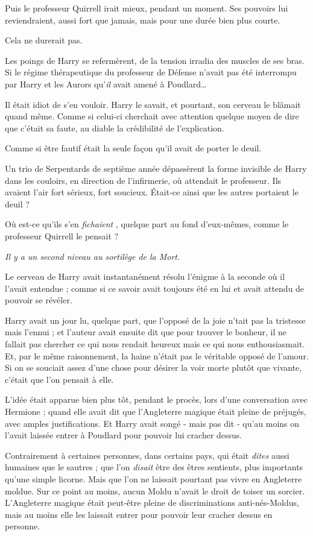 Puis le professeur Quirrell irait mieux, pendant un moment. Ses pouvoirs lui reviendraient, aussi fort que jamais, mais pour une durée bien plus courte.

Cela ne durerait pas.

Les poings de Harry se refermèrent, de la tension irradia des muscles de ses bras. Si le régime thérapeutique du professeur de Défense n'avait pas été interrompu par Harry et les Aurors qu'\emph{il}  avait amené à Poudlard…

Il était idiot de s'en vouloir. Harry le savait, et pourtant, son cerveau le blâmait quand même. Comme si celui-ci cherchait avec attention quelque moyen de dire que c'était sa faute, au diable la crédibilité de l'explication.

Comme si être fautif était la seule façon qu'il avait de porter le deuil.

Un trio de Serpentards de septième année dépassèrent la forme invisible de Harry dans les couloirs, en direction de l'infirmerie, où attendait le professeur. Ils avaient l'air fort sérieux, fort soucieux. Était-ce ainsi que les autres portaient le deuil ?

Où est-ce qu'ils s'en \emph{fichaient} , quelque part au fond d'eux-mêmes, comme le professeur Quirrell le pensait ?

\emph{Il y a un second niveau au sortilège de la Mort.} 

Le cerveau de Harry avait instantanément résolu l'énigme à la seconde où il l'avait entendue ; comme si ce savoir avait toujours été en lui et avait attendu de pouvoir se révéler.

Harry avait un jour lu, quelque part, que l'opposé de la joie n'tait pas la tristesse mais l'ennui ; et l'auteur avait ensuite dit que pour trouver le bonheur, il ne fallait pas chercher ce qui nous rendait heureux mais ce qui nous enthousiasmait. Et, par le même raisonnement, la haine n'était pas le véritable opposé de l'amour. Si on se souciait assez d'une chose pour désirer la voir morte plutôt que vivante, c'était que l'on pensait à elle.

L'idée était apparue bien plus tôt, pendant le procès, lors d'une conversation avec Hermione ; quand elle avait dit que l'Angleterre magique était pleine de préjugés, avec amples justifications. Et Harry avait songé - mais pas dit - qu'au moins on l'avait laissée entrer à Poudlard pour pouvoir lui cracher dessus.

Contrairement à certaines personnes, dans certains pays, qui était \emph{dites}  aussi humaines que le sautres ; que l'on \emph{disait}  être des êtres sentients, plus importants qu'une simple licorne. Mais que l'on ne laissait pourtant pas vivre en Angleterre moldue. Sur ce point au moins, aucun Moldu n'avait le droit de toiser un sorcier. L'Angleterre magique était peut-être pleine de discriminations anti-nés-Moldus, mais au moins elle les laissait entrer pour pouvoir leur cracher dessus en personne.

